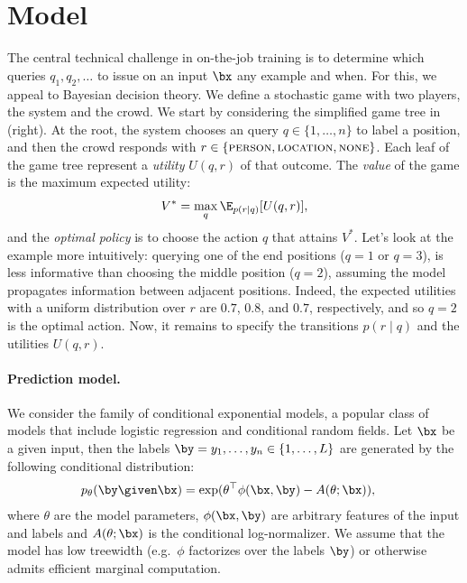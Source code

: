 \section{Model}
\label{sec:model}

The central technical challenge in on-the-job training
is to determine which queries $q_1, q_2, \dots$ to issue on an input $\bx$
any example and when.  For this, we appeal to Bayesian decision theory.
We define a stochastic game with two players, the system and the crowd.
We start by considering the simplified game tree in (right).
At the root, the system chooses an query $q \in \{1, \dots, n\}$ to label a position,
and then the crowd responds with $r \in \{ \textsc{person}{}, \textsc{location}{}, \textsc{none}{} \}$.
Each leaf of the game tree represent a \emph{utility} $U(q, r)$ of that outcome.
The \emph{value} of the game is the maximum expected utility:
\begin{align}
  V^* = \max_q \E_{p(r \mid q)}[U(q, r)],
\end{align}
and the \emph{optimal policy} is to choose the action $q$ that attains $V^*$.
Let's look at the example more intuitively:
querying one of the end positions ($q = 1$ or $q = 3$),
is less informative than choosing the middle position ($q = 2$),
assuming the model propagates information between adjacent positions.
Indeed, the expected utilities with a uniform distribution over $r$
are $0.7$, $0.8$, and $0.7$, respectively, and so $q = 2$ is the optimal action.
Now, it remains to specify the transitions $p(r \mid q)$ and the utilities $U(q, r)$.

\paragraph{Prediction model.}
We consider the family of conditional exponential models, a popular class of models that include logistic regression and conditional random fields.
Let $\bx$ be a given input, then the labels $\by = y_1, \ldots, y_n \in \{1, \dots, L\}$ are generated by the following conditional distribution:
\begin{align*}
  \p(\by \given \bx) 
  &= \exp( \theta^\top \phi(\bx, \by) - A(\theta; \bx)),
\end{align*}
where $\theta$ are the model parameters,
$\phi(\bx, \by)$ are arbitrary features of the input and labels and 
$A(\theta; \bx)$ is the conditional log-normalizer.
We assume that the model has low treewidth (e.g.\ $\phi$ factorizes over the labels $\by$) or otherwise admits efficient marginal computation.

